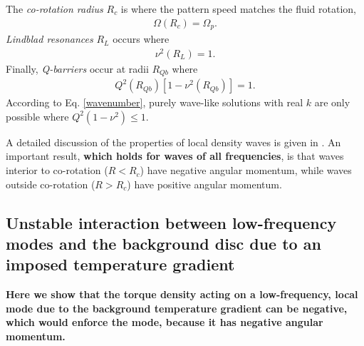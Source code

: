 The \emph{co-rotation radius} $R_c$ is where the pattern speed matches
the fluid rotation,
\begin{align}
  \Omega(R_c) = \Omega_p.
\end{align}
\emph{Lindblad resonances} $R_L$ occurs where
\begin{align}
  \nu^2(R_L) = 1. 
\end{align}
Finally, \emph{Q-barriers} occur at radii $R_{Qb}$ where
\begin{align}
  Q^2(R_{Qb})\left[1-\nu^2(R_{Qb})\right] = 1.  
\end{align}
According to Eq. \ref{wavenumber}, purely wave-like solutions with
real $k$ are only possible where $Q^2(1-\nu^2)\leq1$.  

A detailed discussion of the properties of local density waves 
is given in \cite{shu91}. An important result, {\bf which holds for
  waves of all frequencies}, is that
waves interior to co-rotation ($R<R_c$) have negative angular momentum, while
waves outside co-rotation ($R>R_c$) have positive angular
momentum. 

\subsection{Unstable interaction between low-frequency modes 
  and the background disc due to an imposed temperature gradient}
{\bf 
Here we show that the torque density acting on a low-frequency, 
local mode due to the background temperature gradient can be negative, which 
would enforce the mode, because it has negative angular momentum.  
}

